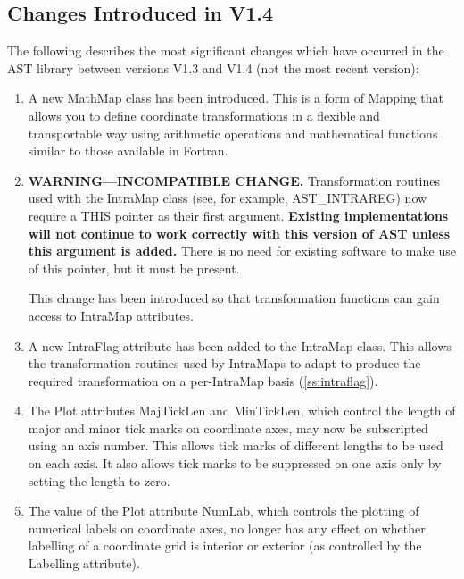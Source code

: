 \documentclass[twoside,11pt]{article}
\newcommand{\htmlref}[2]{#1}
\newcommand{\secref}[1]{\S\ref{#1}}
\renewcommand{\secref}[1]{\ref{#1}}
\begin{document}
\subsection{Changes Introduced in V1.4}

The following describes the most significant changes which have occurred
in the AST library between versions V1.3 and V1.4 (not the most recent
version):

\begin{enumerate}
\item A new \htmlref{MathMap}{MathMap} class has been introduced. This is a form of
\htmlref{Mapping}{Mapping} that allows you to define coordinate transformations in a
flexible and transportable way using arithmetic operations and
mathematical functions similar to those available in Fortran.

\item {\bf{WARNING---INCOMPATIBLE CHANGE.}} Transformation routines
used with the \htmlref{IntraMap}{IntraMap} class (see, for example, \htmlref{AST\_INTRAREG}{AST_INTRAREG}) now
require a THIS pointer as their first argument. {\bf{Existing
implementations will not continue to work correctly with this version
of AST unless this argument is added.}} There is no need for existing
software to make use of this pointer, but it must be present.

This change has been introduced so that transformation functions can gain
access to IntraMap attributes.

\item A new \htmlref{IntraFlag}{IntraFlag} attribute has been added to the IntraMap
class. This allows the transformation routines used by IntraMaps to
adapt to produce the required transformation on a per-IntraMap basis
(\secref{ss:intraflag}).

\item The \htmlref{Plot}{Plot} attributes MajTickLen and MinTickLen, which control the
length of major and minor tick marks on coordinate axes, may now be
subscripted using an axis number. This allows tick marks of different
lengths to be used on each axis. It also allows tick marks to be
suppressed on one axis only by setting the length to zero.

\item The value of the Plot attribute NumLab, which controls the
plotting of numerical labels on coordinate axes, no longer has any
effect on whether labelling of a coordinate grid is interior or
exterior (as controlled by the \htmlref{Labelling}{Labelling} attribute).


\end{enumerate}
\end{document}
